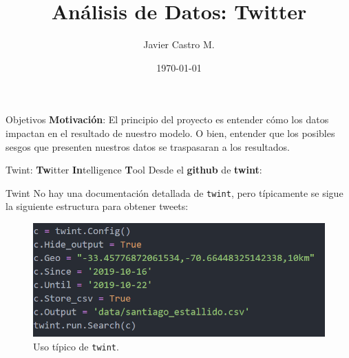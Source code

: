 \documentclass{beamer}
\title[Análisis de Datos: Twitter]{Análisis de Datos: Twitter}
\author{Javier Castro M.}
\institute{Universidad De Chile}
\date{\today}
\begin{document}
	
	\maketitle
	
	\begin{frame}{Objetivos}
		\textbf{Motivación}: El principio del proyecto es entender cómo los datos impactan en el resultado de nuestro modelo. O bien, entender que los posibles sesgos que presenten nuestros datos se traspasaran a los resultados.
	\end{frame}

	\begin{frame}{Twint: \textbf{Tw}itter \textbf{In}telligence \textbf{T}ool}
		Desde el \textbf{github} de \textbf{twint}: \\
		\vspace{1cm}
	\end{frame}

	\begin{frame}{Twint}
		No hay una documentación detallada de \texttt{twint}, pero típicamente se sigue la siguiente estructura para obtener tweets:
		\begin{figure}
			\centering
			\includegraphics[scale=.5]{../imgs/twint_code_example_visual.png}
			\caption{Uso típico de \texttt{twint}.}
		\end{figure}
	\end{frame}
\end{document}

